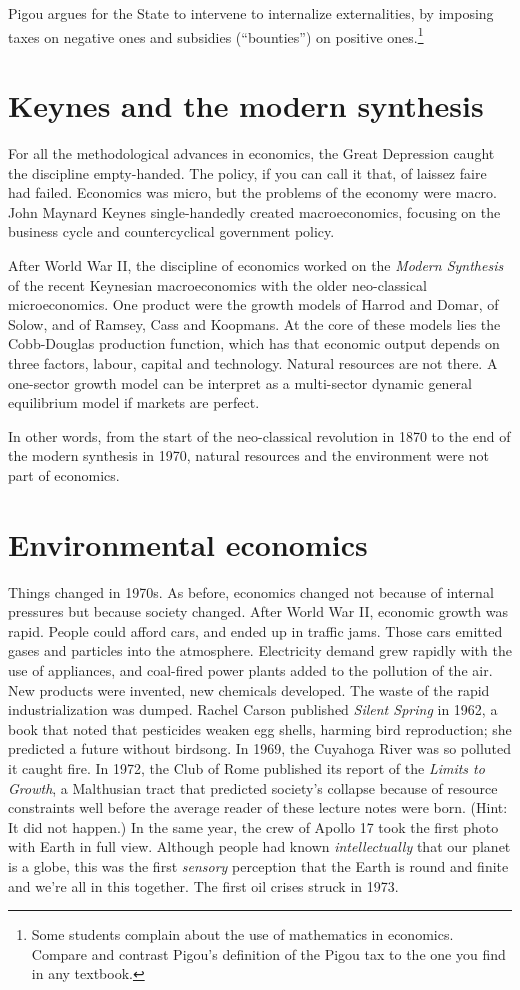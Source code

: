 Pigou argues for the State to intervene to internalize externalities, by imposing taxes on negative ones and subsidies (``bounties'') on positive ones.\footnote{Some students complain about the use of mathematics in economics. Compare and contrast Pigou's definition of the Pigou tax to the one you find in any textbook.}

\section{Keynes and the modern synthesis}
For all the methodological advances in economics, the Great Depression caught the discipline empty-handed. The policy, if you can call it that, of laissez faire had failed. Economics was micro, but the problems of the economy were macro. John Maynard Keynes single-handedly created macroeconomics, focusing on the business cycle and countercyclical government policy.

After World War II, the discipline of economics worked on the \emph{Modern Synthesis} of the recent Keynesian macroeconomics with the older neo-classical microeconomics. One product were the growth models of Harrod and Domar, of Solow, and of Ramsey, Cass and Koopmans. At the core of these models lies the Cobb-Douglas production function, which has that economic output depends on three factors, labour, capital and technology. Natural resources are not there. A one-sector growth model can be interpret as a multi-sector dynamic general equilibrium model if markets are perfect.

In other words, from the start of the neo-classical revolution in 1870 to the end of the modern synthesis in 1970, natural resources and the environment were not part of economics.

\section{Environmental economics}
Things changed in 1970s. As before, economics changed not because of internal pressures but because society changed. After World War II, economic growth was rapid. People could afford cars, and ended up in traffic jams. Those cars emitted gases and particles into the atmosphere. Electricity demand grew rapidly with the use of appliances, and coal-fired power plants added to the pollution of the air. New products were invented, new chemicals developed. The waste of the rapid industrialization was dumped. Rachel Carson published \emph{Silent Spring} in 1962, a book that noted that pesticides weaken egg shells, harming bird reproduction; she predicted a future without birdsong. In 1969, the Cuyahoga River was so polluted it caught fire. In 1972, the Club of Rome published its report of the \emph{Limits to Growth}, a Malthusian tract that predicted society's collapse because of resource constraints well before the average reader of these lecture notes were born. (Hint: It did not happen.) In the same year, the crew of Apollo 17 took the first photo with Earth in full view. Although people had known \emph{intellectually} that our planet is a globe, this was the first \emph{sensory} perception that the Earth is round and finite and we're all in this together. The first oil crises struck in 1973.

